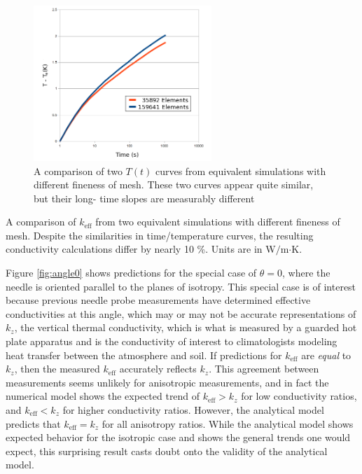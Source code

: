 \begin{figure}[h]
\centering
\includegraphics[width=0.6\textwidth]{fig/conv_curves.png}
\caption{A comparison of two \(T(t)\) curves from equivalent simulations with 
different fineness of mesh. These two curves appear quite similar, but their long-
time slopes are measurably different}
\label{fig:conv_curves}
\end{figure}


\begin{table}[h]
\centering
\caption{A comparison of \(k_{\textrm{eff}}\) from two equivalent simulations 
with different fineness of mesh. Despite the similarities in time/temperature
curves, the resulting  conductivity calculations differ by nearly 10 \%. Units are in W\(/\)m\(\cdot\)K.}

\label{tab:conv_kvals}
\end{table}

Figure \ref{fig:angle0} shows predictions for the special case of
\(\theta = 0 \), where the needle is oriented parallel to the planes of isotropy.
This special case is of interest because previous needle probe measurements have
determined effective conductivities at this angle, which may or may not be
accurate representations of \(k_z\), the vertical thermal conductivity, which is
what is measured by a guarded hot plate apparatus and is the conductivity
of interest to climatologists modeling heat transfer between the atmosphere and
soil. If predictions for \(k_{\textrm{eff}}\) are \emph{equal} to \(k_z\), then
the measured \(k_{\textrm{eff}}\) accurately reflects \(k_z\). This agreement
between measurements seems unlikely for anisotropic measurements, and in fact 
the numerical model shows the expected trend of \(k_{\textrm{eff}} > k_z\) for
low conductivity ratios, and \(k_{\textrm{eff}} < k_z\) for higher conductivity
ratios. However, the analytical model predicts that \(k_{\textrm{eff}} = k_z\)
for all anisotropy ratios. While the analytical model shows expected behavior
for the isotropic case and shows the general trends one would expect, this
surprising result casts doubt onto the validity of the analytical model.


